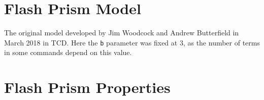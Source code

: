 \section{Flash Prism Model}\label{sec:FlashPM}

The original model developed by Jim Woodcock and Andrew Butterfield
in March 2018 in TCD. Here the \texttt{b} parameter was fixed at 3,
as the number of terms in some commands depend on this value.



\newpage
\section{Flash Prism Properties}\label{sec:FlashPP}

